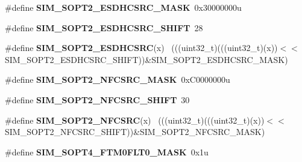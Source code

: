 \begin{DoxyCompactItemize}
\item 
\hypertarget{group___s_i_m___register___masks_ga7e614188b166c6f0fe1413f5c1c2b386}{}\#define {\bfseries S\+I\+M\+\_\+\+S\+O\+P\+T2\+\_\+\+E\+S\+D\+H\+C\+S\+R\+C\+\_\+\+M\+A\+S\+K}~0x30000000u\label{group___s_i_m___register___masks_ga7e614188b166c6f0fe1413f5c1c2b386}

\item 
\hypertarget{group___s_i_m___register___masks_ga7e411a36ada96a59dae3204223bc4233}{}\#define {\bfseries S\+I\+M\+\_\+\+S\+O\+P\+T2\+\_\+\+E\+S\+D\+H\+C\+S\+R\+C\+\_\+\+S\+H\+I\+F\+T}~28\label{group___s_i_m___register___masks_ga7e411a36ada96a59dae3204223bc4233}

\item 
\hypertarget{group___s_i_m___register___masks_gaaa3bccda37b66d40358c5311e543c732}{}\#define {\bfseries S\+I\+M\+\_\+\+S\+O\+P\+T2\+\_\+\+E\+S\+D\+H\+C\+S\+R\+C}(x)                                    ~(((uint32\+\_\+t)(((uint32\+\_\+t)(x))$<$$<$S\+I\+M\+\_\+\+S\+O\+P\+T2\+\_\+\+E\+S\+D\+H\+C\+S\+R\+C\+\_\+\+S\+H\+I\+F\+T))\&S\+I\+M\+\_\+\+S\+O\+P\+T2\+\_\+\+E\+S\+D\+H\+C\+S\+R\+C\+\_\+\+M\+A\+S\+K)\label{group___s_i_m___register___masks_gaaa3bccda37b66d40358c5311e543c732}

\item 
\hypertarget{group___s_i_m___register___masks_ga711ae34c74bd223215f0c330daba2cfa}{}\#define {\bfseries S\+I\+M\+\_\+\+S\+O\+P\+T2\+\_\+\+N\+F\+C\+S\+R\+C\+\_\+\+M\+A\+S\+K}~0x\+C0000000u\label{group___s_i_m___register___masks_ga711ae34c74bd223215f0c330daba2cfa}

\item 
\hypertarget{group___s_i_m___register___masks_gac27f796146be87b5856f83d73cb94706}{}\#define {\bfseries S\+I\+M\+\_\+\+S\+O\+P\+T2\+\_\+\+N\+F\+C\+S\+R\+C\+\_\+\+S\+H\+I\+F\+T}~30\label{group___s_i_m___register___masks_gac27f796146be87b5856f83d73cb94706}

\item 
\hypertarget{group___s_i_m___register___masks_gaa1050be2378f3f97dcebc27ee5c6e58c}{}\#define {\bfseries S\+I\+M\+\_\+\+S\+O\+P\+T2\+\_\+\+N\+F\+C\+S\+R\+C}(x)                                        ~(((uint32\+\_\+t)(((uint32\+\_\+t)(x))$<$$<$S\+I\+M\+\_\+\+S\+O\+P\+T2\+\_\+\+N\+F\+C\+S\+R\+C\+\_\+\+S\+H\+I\+F\+T))\&S\+I\+M\+\_\+\+S\+O\+P\+T2\+\_\+\+N\+F\+C\+S\+R\+C\+\_\+\+M\+A\+S\+K)\label{group___s_i_m___register___masks_gaa1050be2378f3f97dcebc27ee5c6e58c}

\item 
\hypertarget{group___s_i_m___register___masks_gaa868cd9e56dc4f0280f6d1866da1ac57}{}\#define {\bfseries S\+I\+M\+\_\+\+S\+O\+P\+T4\+\_\+\+F\+T\+M0\+F\+L\+T0\+\_\+\+M\+A\+S\+K}~0x1u\label{group___s_i_m___register___masks_gaa868cd9e56dc4f0280f6d1866da1ac57}


\end{DoxyCompactItemize}
